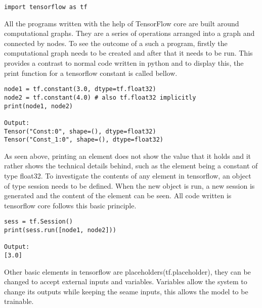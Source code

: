 \begin{lstlisting}
import tensorflow as tf
\end{lstlisting}

All the programs written with the help of TensorFlow core are built around computational graphs. 
They are a series of operations arranged into a graph and connected by nodes. 
To see the outcome of a such a program, 
firstly the computational graph needs to be created and after that it needs to be run. 
This provides a contrast to normal code written in python and to display this, 
the print function for a tensorflow constant is called bellow.

\begin{lstlisting}
node1 = tf.constant(3.0, dtype=tf.float32)
node2 = tf.constant(4.0) # also tf.float32 implicitly
print(node1, node2)

Output:
Tensor("Const:0", shape=(), dtype=float32)
Tensor("Const_1:0", shape=(), dtype=float32) 
\end{lstlisting}

As seen above, printing an element does not show the value that it holds and it rather shows the technical details behind,
such as the element being a constant of type float32.
To investigate the contents of any element in tensorflow,
an object of type session needs to be defined.
When the new object is run, a new session is generated and the content of the element can be seen.
All code written is tensorflow core follows this basic principle.

\begin{lstlisting}
sess = tf.Session()
print(sess.run([node1, node2]))

Output:
[3.0]
\end{lstlisting}

Other basic elements in tensorflow are
placeholders(tf.placeholder), they can be changed to accept 
external inputs and variables. Variables allow the system to
change its outputs while keeping the seame inputs,
this allows the model to be trainable. 

